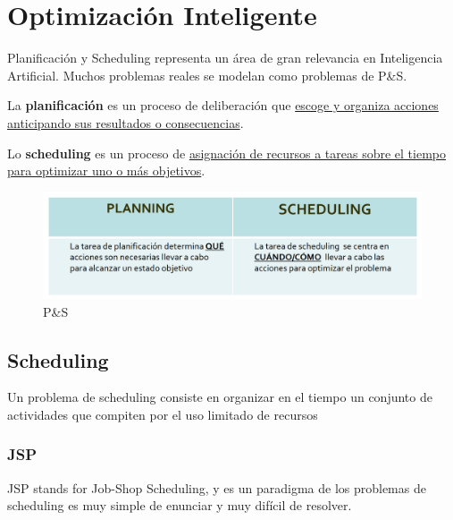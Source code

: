 \chapter{Optimización Inteligente}
Planificación y Scheduling representa un área de gran relevancia en Inteligencia Artificial. Muchos problemas reales se modelan como problemas de P\&S.

La \textbf{planificación} es un proceso de deliberación que \ul{escoge y organiza acciones anticipando sus resultados o consecuencias}.

Lo \textbf{scheduling} es un proceso de \ul{asignación de recursos a tareas sobre el tiempo para optimizar uno o más objetivos}.

\begin{figure}[htbp]
   \centering
   \includegraphics{images/04/PS.png}
   \caption{P\&S}
   \label{fig:04/PS}
\end{figure}
\section{Scheduling}
Un problema de scheduling consiste en organizar en el tiempo un
conjunto de actividades que compiten por el uso limitado de recursos


\subsection{JSP}
JSP stands for Job-Shop Scheduling, y es un paradigma de los problemas de scheduling es muy simple de
enunciar y muy difícil de resolver.

